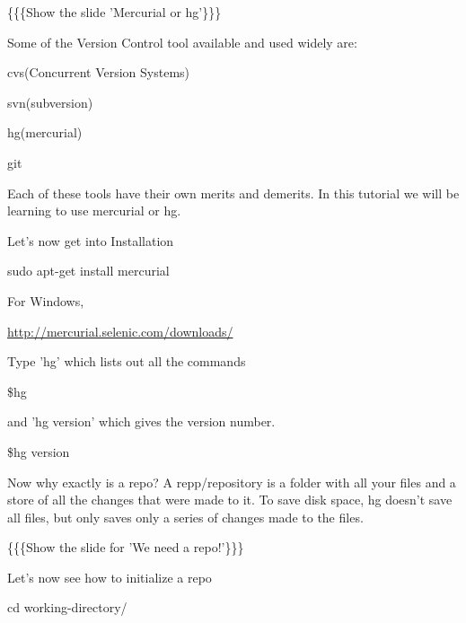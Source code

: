 \documentclass[a4paper,english]{article}
\begin{document}

\{\{\{Show the slide 'Mercurial or hg'\}\}\}


Some of the Version Control tool available and used widely are:
\setcounter{listcnt0}{0}
\begin{list}{.}
{
\setlength{\rightmargin}{\leftmargin}
}

\item cvs(Concurrent Version Systems)

\item svn(subversion)

\item hg(mercurial)

\item git
\end{list}


Each of these tools have their own merits and demerits. In this tutorial we will be learning to use mercurial or hg.

Let's now get into Installation


sudo apt-get install mercurial


For Windows,


\url{http://mercurial.selenic.com/downloads/}

Type 'hg' which lists out all the commands


\$hg


and 'hg version' which gives the version number.


\$hg version


Now why exactly is a repo? A repp/repository is a folder with all your files and a store of all the changes that were made to it. To save disk space, hg doesn't save all files, but only saves only a series of changes made to the files.


\{\{\{Show the slide for 'We need a repo!'\}\}\}


Let's now see how to initialize a repo


cd working-directory/
\end{document}
